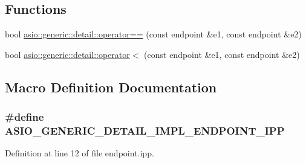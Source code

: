 \subsection*{Functions}
\begin{DoxyCompactItemize}
\item 
bool \hyperlink{namespaceasio_1_1generic_1_1detail_a74739b613ca93792e00c667d26f2b04c}{asio\+::generic\+::detail\+::operator==} (const endpoint \&e1, const endpoint \&e2)
\item 
bool \hyperlink{namespaceasio_1_1generic_1_1detail_ab3d290eb5d0b8b0ecfe2604643749ffc}{asio\+::generic\+::detail\+::operator$<$} (const endpoint \&e1, const endpoint \&e2)
\end{DoxyCompactItemize}


\subsection{Macro Definition Documentation}
\hypertarget{generic_2detail_2impl_2endpoint_8ipp_af488dcaa0974297e644c0345fc94112e}{}
\subsubsection[{A\+S\+I\+O\+\_\+\+G\+E\+N\+E\+R\+I\+C\+\_\+\+D\+E\+T\+A\+I\+L\+\_\+\+I\+M\+P\+L\+\_\+\+E\+N\+D\+P\+O\+I\+N\+T\+\_\+\+I\+P\+P}]{\setlength{\rightskip}{0pt plus 5cm}\#define A\+S\+I\+O\+\_\+\+G\+E\+N\+E\+R\+I\+C\+\_\+\+D\+E\+T\+A\+I\+L\+\_\+\+I\+M\+P\+L\+\_\+\+E\+N\+D\+P\+O\+I\+N\+T\+\_\+\+I\+P\+P}\label{generic_2detail_2impl_2endpoint_8ipp_af488dcaa0974297e644c0345fc94112e}


Definition at line 12 of file endpoint.\+ipp.

